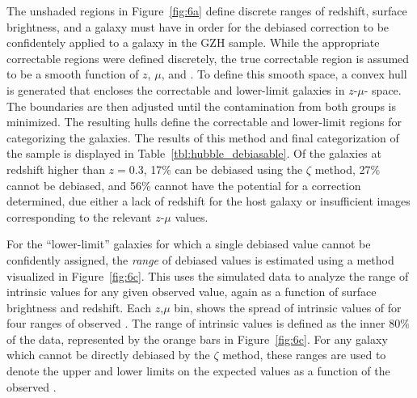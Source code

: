 \documentclass[twocolumn]{aastex6}
\begin{document}
The unshaded regions in Figure~\ref{fig:6a} define discrete ranges of redshift, surface brightness, and \pfeatures{} a galaxy must have in order for the debiased correction to be confidentely applied to a galaxy in the GZH sample. While the appropriate correctable regions were defined discretely, the true correctable region is assumed to be a smooth function of $z$, $\mu$, and \pfeatures{}. To define this smooth space, a convex hull is generated that encloses the correctable and lower-limit \ferengi{} galaxies in $z$-$\mu$-\pfeatures{} space. The boundaries are then adjusted until the contamination from both groups is minimized. The resulting hulls define the correctable and lower-limit regions for categorizing the \hst{} galaxies. The results of this method and final categorization of the \hst{} sample is displayed in Table~\ref{tbl:hubble_debiasable}. Of the galaxies at redshift higher than $z=0.3$, 17\% can be debiased using the $\zeta$ method, 27\% cannot be debiased, and 56\% cannot have the potential for a correction determined, due either a lack of redshift for the host galaxy or insufficient \ferengi{} images corresponding to the relevant $z$-$\mu$ values.

For the ``lower-limit'' galaxies for which a single debiased \pfeatures{} value cannot be confidently assigned, the \emph{range} of debiased values is estimated using a method visualized in Figure~\ref{fig:6c}. This uses the \ferengi{} simulated data to analyze the range of intrinsic \pfeaturesrest{} values for any given observed \pfeatures{} value, again as a function of surface brightness and redshift. Each $z$,$\mu$ bin, shows the spread of intrinsic values of \pfeaturesrest{} for four ranges of observed \pfeatures. The range of intrinsic values is defined as the inner 80\% of the data, represented by the orange bars in Figure~\ref{fig:6c}. For any galaxy which cannot be directly debiased by the $\zeta$ method, these ranges are used to denote the upper and lower limits on the expected values \pfeaturesrest{} as a function of the observed \pfeatures. 
\end{document}
